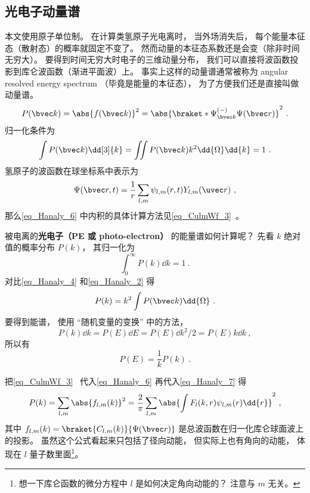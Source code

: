 

\subsection{光电子动量谱}

本文使用原子单位制。 在计算类氢原子光电离时， 当外场消失后， 每个能量本征态（散射态）的概率就固定不变了。 然而动量的本征态系数还是会变（除非时间无穷大）。 要得到时间无穷大时电子的三维动量分布， 我们可以直接将波函数投影到库仑波函数（渐进平面波）上。 事实上这样的动量谱通常被称为 angular resolved energy spectrum （毕竟是能量的本征态）， 为了方便我们还是直接叫做动量谱。
\begin{equation}\label{eq_Hanaly_6}
P(\bvec k) = \abs{f(\bvec k)}^2 = \abs{\braket*{\Psi^{(-)}_{\bvec k}}{\Psi(\bvec r)}}^2~.
\end{equation}
归一化条件为
\begin{equation}\label{eq_Hanaly_4}
\int P(\bvec k) \dd[3]{k} = \iint P(\bvec k) k^2\dd{\Omega}\dd{k} = 1~.
\end{equation}
氢原子的波函数在球坐标系中表示为
\begin{equation}
\Psi(\bvec r, t) = \frac{1}{r}\sum_{l,m} \psi_{l,m}(r, t) Y_{l,m}(\uvec r)~,
\end{equation}
那么\autoref{eq_Hanaly_6} 中内积的具体计算方法见\autoref{eq_CulmWf_3}~。

被电离的\textbf{光电子（PE 或 photo-electron）} 的能量谱如何计算呢？ 先看 $k$ 绝对值的概率分布 $P(k)$， 其归一化为
\begin{equation}\label{eq_Hanaly_2}
\int_0^\infty P(k) \dd{k} = 1~.
\end{equation}
对比\autoref{eq_Hanaly_4} 和\autoref{eq_Hanaly_2} 得
\begin{equation}\label{eq_Hanaly_7}
P(k) = k^2 \int P(\bvec k) \dd{\Omega}~.
\end{equation}
要得到能谱， 使用 “随机变量的变换” 中的方法，
\begin{equation}\label{eq_Hanaly_1}
P(k)\dd{k} = P(E)\dd{E} = P(E)\dd{k^2/2} = P(E)k\dd{k}~,
\end{equation}
所以有
\begin{equation}
P(E) = \frac{1}{k}P(k)~.
\end{equation}

把\autoref{eq_CulmWf_3}~ 代入\autoref{eq_Hanaly_6} 再代入\autoref{eq_Hanaly_7} 得
\begin{equation}
P(k) = \sum_{l,m} \abs{f_{l,m}(k)}^2 = \frac{2}{\pi} \sum_{l,m} \abs{\int F_l(k, r) \psi_{l,m}(r) \dd{r}}^2~,
\end{equation}
其中 $f_{l,m}(k) = \braket{C_{l,m}(k)}{\Psi(\bvec r)}$ 是总波函数在归一化库仑球面波上的投影。 虽然这个公式看起来只包括了径向动能， 但实际上也有角向的动能， 体现在 $l$ 量子数里面\footnote{想一下库仑函数的微分方程中 $l$ 是如何决定角向动能的？ 注意与 $m$ 无关。}。

